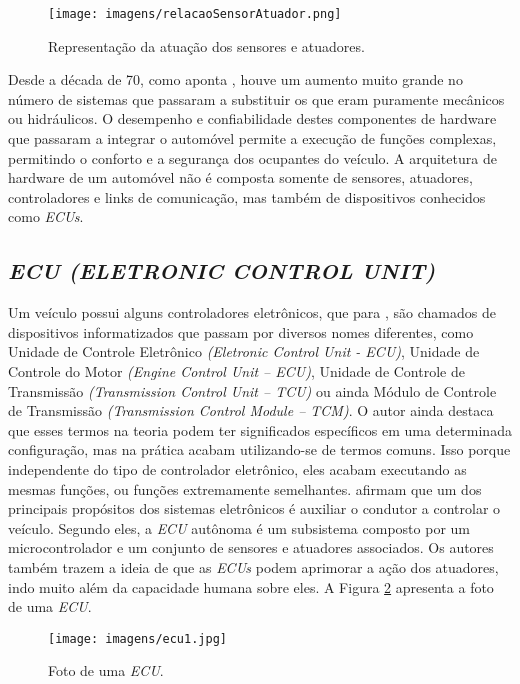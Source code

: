 \begin{figure}[!ht]
\centering
\caption{Representação da atuação dos sensores e atuadores.} 
{\texttt{[image: imagens/relacaoSensorAtuador.png]}}\\
 \label{Fig:relacao_sensor_atuador}
\end{figure}

Desde a década de 70, como aponta , houve um aumento muito grande no número de sistemas que passaram a substituir os que eram puramente mecânicos ou hidráulicos. O desempenho e confiabilidade destes componentes de hardware que passaram a integrar o automóvel permite a execução de funções complexas, permitindo o conforto e a segurança dos ocupantes do veículo. A arquitetura de hardware de um automóvel não é composta somente de sensores, atuadores, controladores e links de comunicação, mas também de dispositivos conhecidos como \textit{ECUs}.

\subsection{\textit{ECU (ELETRONIC CONTROL UNIT)}}
Um veículo possui alguns controladores eletrônicos, que para , são chamados de dispositivos informatizados que passam por diversos nomes diferentes, como Unidade de Controle Eletrônico \textit{(Eletronic Control Unit - ECU)}, Unidade de Controle do Motor \textit{(Engine Control Unit – ECU)}, Unidade de Controle de Transmissão \textit{(Transmission Control Unit – TCU)} ou ainda Módulo de Controle de Transmissão \textit{(Transmission Control Module – TCM)}. O autor ainda destaca que esses termos na teoria podem ter significados específicos em uma determinada configuração, mas na prática acabam utilizando-se de termos comuns. Isso porque independente do tipo de controlador eletrônico, eles acabam executando as mesmas funções, ou funções extremamente semelhantes.  afirmam que um dos principais propósitos dos sistemas eletrônicos é auxiliar o condutor a controlar o veículo. Segundo eles, a \textit{ECU} autônoma é um subsistema composto por um microcontrolador e um conjunto de sensores e atuadores associados. Os autores também trazem a ideia de que as \textit{ECUs} podem aprimorar a ação dos atuadores, indo muito além da capacidade humana sobre eles. A Figura \ref{Fig:ecu} apresenta a foto de uma \textit{ECU}.

\begin{figure}[!ht]
\centering
\caption{Foto de uma \textit{ECU}.} 
{\texttt{[image: imagens/ecu1.jpg]}}\\
 \label{Fig:ecu}
\end{figure}

